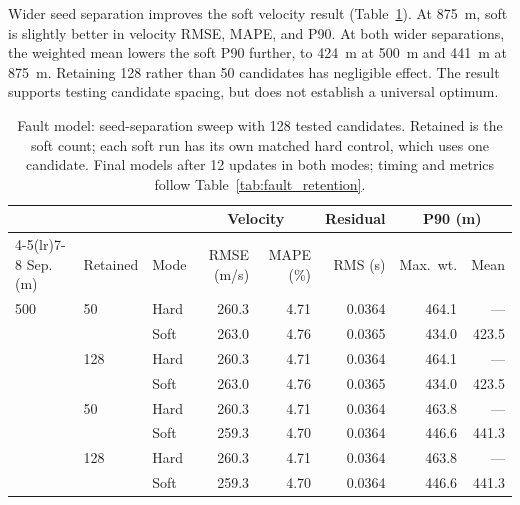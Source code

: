 Wider seed separation improves the soft velocity result (Table~\ref{tab:fault_separation}). At 875~m, soft is slightly better in velocity RMSE, MAPE, and P90. At both wider separations, the weighted mean lowers the soft P90 further, to 424~m at 500~m and 441~m at 875~m. Retaining 128 rather than 50 candidates has negligible effect. The result supports testing candidate spacing, but does not establish a universal optimum.

\begin{table}[!htb]
\centering
\begin{singlespace}
\small
\setlength{\tabcolsep}{3.5pt}
\caption{Fault model: seed-separation sweep with 128 tested candidates. Retained is the soft count; each soft run has its own matched hard control, which uses one candidate. Final models after 12 updates in both modes; timing and metrics follow Table~\ref{tab:fault_retention}.}
\label{tab:fault_separation}
\smallskip
\begin{tabular}{lllrrrrr}
\toprule
& & & \multicolumn{2}{c}{Velocity} & Residual & \multicolumn{2}{c}{P90 (m)} \\
\cmidrule(lr){4-5}\cmidrule(lr){7-8}
Sep. (m) & Retained & Mode & RMSE (m/s) & MAPE (\%) & RMS (s) & Max.\ wt. & Mean \\
\midrule
500 & 50 & Hard & 260.3 & 4.71 & 0.0364 & 464.1 & --- \\
 &  & Soft & 263.0 & 4.76 & 0.0365 & 434.0 & 423.5 \\
\addlinespace
 & 128 & Hard & 260.3 & 4.71 & 0.0364 & 464.1 & --- \\
 &  & Soft & 263.0 & 4.76 & 0.0365 & 434.0 & 423.5 \\
\addlinespace
875 & 50 & Hard & 260.3 & 4.71 & 0.0364 & 463.8 & --- \\
 &  & Soft & 259.3 & 4.70 & 0.0364 & 446.6 & 441.3 \\
\addlinespace
 & 128 & Hard & 260.3 & 4.71 & 0.0364 & 463.8 & --- \\
 &  & Soft & 259.3 & 4.70 & 0.0364 & 446.6 & 441.3 \\
\bottomrule
\end{tabular}
\end{singlespace}
\end{table}
